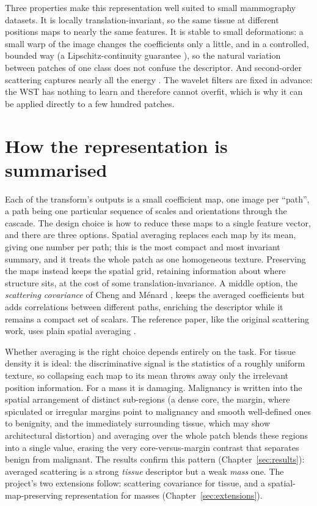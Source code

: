 Three properties make this representation well suited to small mammography datasets. It is locally translation-invariant, so the same tissue at different positions maps to nearly the same features. It is stable to small deformations: a small warp of the image changes the coefficients only a little, and in a controlled, bounded way (a Lipschitz-continuity guarantee \cite{mallat2012invariant}), so the natural variation between patches of one class does not confuse the descriptor. And second-order scattering captures nearly all the energy \cite{bruna2013invariant}. The wavelet filters are fixed in advance: the WST has nothing to learn and therefore cannot overfit, which is why it can be applied directly to a few hundred patches.

\section{How the representation is summarised}

Each of the transform's outputs is a small coefficient map, one image per ``path'', a path being one particular sequence of scales and orientations through the cascade. The design choice is how to reduce these maps to a single feature vector, and there are three options. Spatial averaging replaces each map by its mean, giving one number per path; this is the most compact and most invariant summary, and it treats the whole patch as one homogeneous texture. Preserving the maps instead keeps the spatial grid, retaining information about where structure sits, at the cost of some translation-invariance. A middle option, the \emph{scattering covariance} of Cheng and M\'enard \cite{cheng2021scattering}, keeps the averaged coefficients but adds correlations between different paths, enriching the descriptor while it remains a compact set of scalars. The reference paper, like the original scattering work, uses plain spatial averaging \cite{bruna2013invariant, razali2023cnn}.

Whether averaging is the right choice depends entirely on the task. For tissue density it is ideal: the discriminative signal is the statistics of a roughly uniform texture, so collapsing each map to its mean throws away only the irrelevant position information. For a mass it is damaging. Malignancy is written into the spatial arrangement of distinct sub-regions (a dense core, the margin, where spiculated or irregular margins point to malignancy and smooth well-defined ones to benignity, and the immediately surrounding tissue, which may show architectural distortion) and averaging over the whole patch blends these regions into a single value, erasing the very core-versus-margin contrast that separates benign from malignant. The results confirm this pattern (Chapter~\ref{sec:results}): averaged scattering is a strong \emph{tissue} descriptor but a weak \emph{mass} one. The project's two extensions follow: scattering covariance for tissue, and a spatial-map-preserving representation for masses (Chapter~\ref{sec:extensions}).

